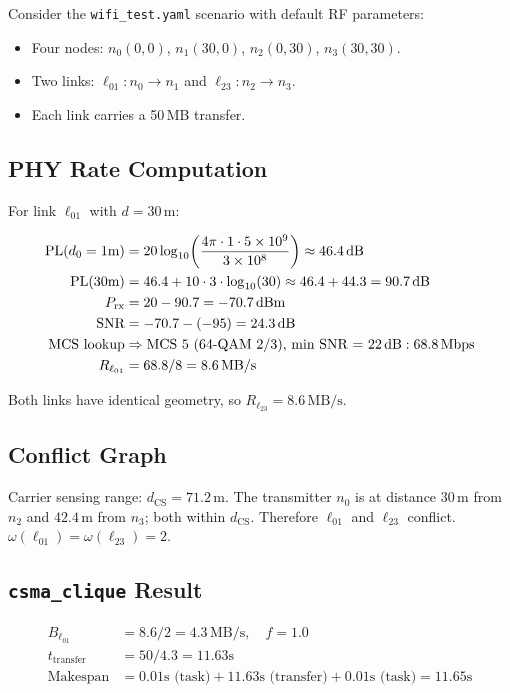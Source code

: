 \documentclass[11pt,letterpaper]{article}
\newcommand{\dBm}{\,\text{dBm}}
\newcommand{\dB}{\,\text{dB}}
\newcommand{\Mbps}{\,\text{Mbps}}
\newcommand{\MBps}{\,\text{MB/s}}
\begin{document}
Consider the \texttt{wifi\_test.yaml} scenario with default RF parameters:

\begin{itemize}[itemsep=2pt]
\item Four nodes: $n_0(0,0)$, $n_1(30,0)$, $n_2(0,30)$, $n_3(30,30)$.
\item Two links: $\ell_{01}: n_0 \to n_1$ and $\ell_{23}: n_2 \to n_3$.
\item Each link carries a 50\,MB transfer.
\end{itemize}

\subsection{PHY Rate Computation}

For link $\ell_{01}$ with $d = 30$\,m:

\begin{align*}
\text{PL}(d_0 = 1\text{m}) &= 20\log_{10}\!\left(\frac{4\pi \cdot 1 \cdot 5\times 10^9}{3\times 10^8}\right) \approx 46.4\dB \\
\text{PL}(30\text{m}) &= 46.4 + 10 \cdot 3 \cdot \log_{10}(30) \approx 46.4 + 44.3 = 90.7\dB \\
P_\text{rx} &= 20 - 90.7 = -70.7\dBm \\
\text{SNR} &= -70.7 - (-95) = 24.3\dB \\
\text{MCS lookup} &\Rightarrow \text{MCS 5 (64-QAM 2/3), min SNR = 22\dB}: 68.8\Mbps \\
R_{\ell_{01}} &= 68.8 / 8 = 8.6\MBps
\end{align*}

Both links have identical geometry, so $R_{\ell_{23}} = 8.6\MBps$.

\subsection{Conflict Graph}

Carrier sensing range: $d_\text{CS} = 71.2$\,m.  The transmitter $n_0$ is at
distance $30$\,m from $n_2$ and $42.4$\,m from $n_3$; both within $d_\text{CS}$.
Therefore $\ell_{01}$ and $\ell_{23}$ conflict.  $\omega(\ell_{01}) =
\omega(\ell_{23}) = 2$.

\subsection{\texttt{csma\_clique} Result}

\begin{align*}
B_{\ell_{01}} &= 8.6 / 2 = 4.3\MBps, \quad f = 1.0 \\
t_\text{transfer} &= 50 / 4.3 = 11.63\text{s} \\
\text{Makespan} &= 0.01\text{s (task)} + 11.63\text{s (transfer)} + 0.01\text{s (task)} = 11.65\text{s}
\end{align*}
\end{document}
